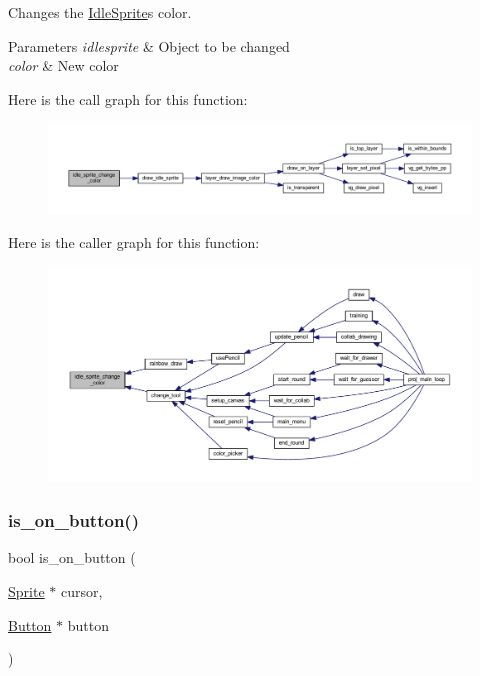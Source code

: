 Changes the \mbox{\hyperlink{struct_idle_sprite}{Idle\+Sprite}}\textquotesingle{}s color. 


\begin{DoxyParams}{Parameters}
{\em idlesprite} & Object to be changed \\
\hline
{\em color} & New color \\
\hline
\end{DoxyParams}
Here is the call graph for this function\+:\nopagebreak
\begin{figure}[H]
\begin{center}
\leavevmode
\includegraphics[width=350pt]{group__sprite_gabae3594520c7d515ffda965caae199af_cgraph}
\end{center}
\end{figure}
Here is the caller graph for this function\+:\nopagebreak
\begin{figure}[H]
\begin{center}
\leavevmode
\includegraphics[width=350pt]{group__sprite_gabae3594520c7d515ffda965caae199af_icgraph}
\end{center}
\end{figure}
\mbox{\label{group__sprite_ga8fe18a5b062a81b4b99dc62f0643446c}} 
\subsubsection{\texorpdfstring{is\+\_\+on\+\_\+button()}{is\_on\_button()}}
{\footnotesize\ttfamily bool is\+\_\+on\+\_\+button (\begin{DoxyParamCaption}\item[{\mbox{\hyperlink{struct_sprite}{Sprite}} $\ast$}]{cursor,  }\item[{\mbox{\hyperlink{struct_button}{Button}} $\ast$}]{button }\end{DoxyParamCaption})}



